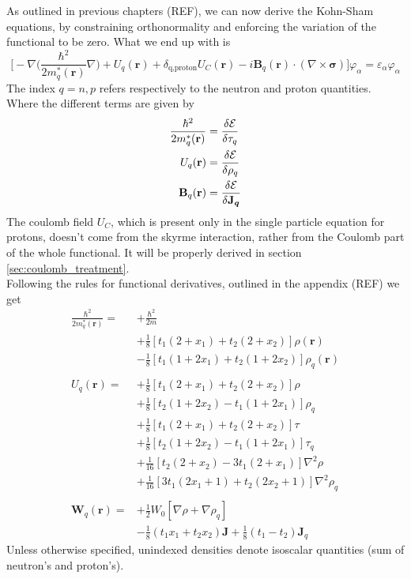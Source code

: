 As outlined in previous chapters (REF), we can now derive the Kohn-Sham equations, by constraining orthonormality and enforcing the variation of the functional to be zero. What we end up with is
\begin{equation}
    \label{eq:spe_ks}
    \bigg[-\nabla\bigg(\frac{\hbar^2}{2m^{*}_q(\mathbf r)}\nabla \bigg) + U_q(\mathbf r) + \delta_{\text{q,proton}}U_C(\mathbf r)-i\mathbf B_q(\mathbf r)\cdot(\nabla \times \boldsymbol\sigma) \bigg]\varphi_\alpha=\varepsilon_\alpha\varphi_\alpha
\end{equation}
The index $q=n,p$ refers respectively to the neutron and proton quantities.
\\Where the different terms are given by
\begin{align}
    \frac{\hbar^2}{2m^{*}_q(\mathbf r)} &= \fdv{\mathcal E}{\tau_q}
    \\U_q(\mathbf r) &= \fdv{\mathcal E}{\rho_q}\label{eq:fdv_rho_skyrme}
    \\\mathbf B_q(\mathbf r) &= \fdv{\mathcal E}{\boldsymbol{\mathbf J_q}}
\end{align}
The coulomb field $U_C$, which is present only in the single particle equation for protons, doesn't come from the skyrme interaction, rather from the Coulomb part of the whole functional. It will be properly derived in section \ref{sec:coulomb_treatment}.
\\Following the rules for functional derivatives, outlined in the appendix (REF) we get
\begin{align}
    \frac{\hbar^2}{2m_q^*(\mathbf r)} =& +\frac{\hbar^2}{2m} \\&+ \frac 1 8 [t_1(2+x_1)+t_2(2+x_2)]\rho(\mathbf r) \\&- \frac 1 8 [t_1(1+2x_1)+t_2(1+2x_2)]\rho_q(\mathbf r ) \\\\
    U_q(\mathbf r) =& +\frac 1 8 [t_1(2+x_1)+t_2(2+x_2)]\rho \\&+ \frac 1 8 [t_2(1+2x_2)-t_1(1+2x_1)]\rho_q \\
    &+ \frac 1 8 [t_1(2+x_1)+t_2(2+x_2)]\tau \\&+ \frac 1 8 [t_2(1+2x_2)-t_1(1+2x_1)]\tau_q \\
    &+ \frac 1 {16} [t_2(2+x_2)-3t_1(2+x_1)] \nabla^2 \rho \\&+ \frac 1 {16} [3t_1(2x_1+1)+t_2(2x_2+1)] \nabla^2 \rho_q \\\\
    \mathbf W_q (\mathbf r ) = &+\frac 1 2 W_0 [\nabla\rho + \nabla \rho_q] \\&-\frac 1 8 (t_1 x_1 + t_2 x_2) \mathbf J + \frac 1 8 (t_1 - t_2) \mathbf J_q 
\end{align}
Unless otherwise specified, unindexed densities denote isoscalar quantities (sum of neutron's and proton's).